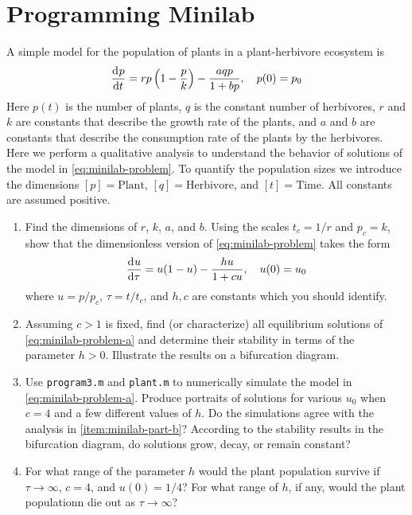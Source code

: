 \documentclass[12pt]{article}
\begin{document}
\section{Programming Minilab}
A simple model for the population of plants in a plant-herbivore ecosystem is
\begin{equation}
  \label{eq:minilab-problem}
  \frac{\mathrm{d}^{} {p}}{\mathrm{d}{t}^{}} = rp\left( 1-\frac{p}{k} \right) - \frac{aqp}{1+bp}, \quad p(0)=p_0
\end{equation}
Here $p(t)$ is the number of plants, $q$ is the constant number of herbivores,
$r$ and $k$ are constants that describe the growth rate of the plants, and $a$
and $b$ are constants that describe the consumption rate of the plants by the
herbivores. Here we perform a qualitative analysis to understand the behavior of
solutions of the model in \cref{eq:minilab-problem}. To quantify the population
sizes we introduce the dimensions $[p] = \text{Plant}$, $[q] =
\text{Herbivore}$, and $[t] = \text{Time}$. All constants are assumed positive.
\begin{enumerate}
\item Find the dimensions of $r$, $k$, $a$, and $b$. Using the scales $t_c =
  1/r$ and $p_c = k$, show that the dimensionless version of
  \cref{eq:minilab-problem} takes the form
  \begin{equation}
    \label{eq:minilab-problem-a}
    \frac{\mathrm{d}^{} {u}}{\mathrm{d}{\tau}^{}}=u(1-u)-\frac{hu}{1+cu},\quad u(0)=u_0
  \end{equation}
  where $u=p/p_c$, $\tau=t/t_c$, and $h,c$ are constants which you should
  identify.
\item Assuming $c>1$ is fixed, find (or characterize) all equilibrium solutions
  of \cref{eq:minilab-problem-a} and determine their stability in terms of the
  parameter $h>0$. Illustrate the results on a bifurcation diagram.
\label{item:minilab-part-b}
\item Use \verb|program3.m| and \verb|plant.m| to numerically simulate the model
  in \cref{eq:minilab-problem-a}. Produce portraits of solutions for various
  $u_0$ when $c=4$ and a few different values of $h$. Do the simulations agree
  with the analysis in \cref{item:minilab-part-b}? According to the stability
  results in the bifurcation diagram, do solutions grow, decay, or remain
  constant?
\item For what range of the parameter $h$ would the plant population survive if
  $\tau\rightarrow\infty$, $c=4$, and $u(0)=1/4$? For what range of $h$, if any,
  would the plant populationn die out as $\tau\rightarrow\infty$?

\end{enumerate}
\end{document}
